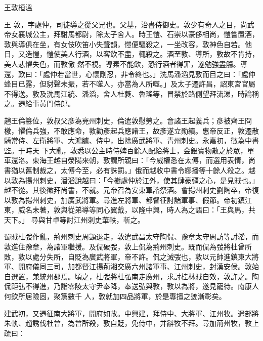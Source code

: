 
\begin{pinyinscope}

 王敦桓溫



 王
 敦，字處仲，司徒導之從父兄也。父基，治書侍御史。敦少有奇人之目，尚武帝女襄城公主，拜駙馬都尉，除太子舍人。時王愷、石崇以豪侈相尚，愷嘗置酒，敦與導俱在坐，有女伎吹笛小失聲韻，愷便驅殺之，一坐改容，敦神色自若。他日，又造愷，愷使美人行酒，以客飲不盡，輒殺之。酒至敦、導所，敦故不肯持，美人悲懼失色，而敦傲
 然不視。導素不能飲，恐行酒者得罪，遂勉強盡觴。導還，歎曰：「處仲若當世，心懷剛忍，非令終也。」洗馬潘滔見敦而目之曰：「處仲蜂目已露，但豺聲未振，若不噬人，亦當為人所噬。」及太子遷許昌，詔東宮官屬不得送。敦及洗馬江統、潘滔，舍人杜蕤、魯瑤等，冒禁於路側望拜流涕，時論稱之。遷給事黃門侍郎。



 趙王倫篡位，敦叔父彥為兗州刺史，倫遣敦慰勞之。會諸王起義兵；彥被齊王冏檄，懼倫兵強，不敢應命，敦勸彥起兵應諸王，故彥遂立勛績。惠帝反正，敦遷散騎常侍、左衛將軍、大鴻臚、侍中，出除廣武將軍、青州刺史。永嘉初，徵為中書監。于時天
 下大亂，敦悉以公主時侍婢百餘人配給將士，金銀寶物散之於眾，單車還洛。東海王越自滎陽來朝，敦謂所親曰：「今威權悉在太傅，而選用表情，尚書猶以舊制裁之，太傅今至，必有誅罰。」俄而越收中書令繆播等十餘人殺之。越以敦為揚州刺史，潘滔說越曰：「今樹處仲於江外，使其肆豪彊之心，是見賊也。」越不從。其後徵拜尚書，不就。元帝召為安東軍諮祭酒。會揚州刺史劉陶卒，帝復以敦為揚州刺史，加廣武將軍。尋進左將軍、都督征討諸軍事、假節。帝初鎮江東，威名未著，敦與從弟導等同心翼戴，以隆中興，時人為之語曰：「王與馬，共天下。」
 尋與甘卓等討江州刺史華軼，斬之。



 蜀賊杜弢作亂，荊州刺史周顗退走，敦遣武昌太守陶侃、豫章太守周訪等討韜，而敦進住豫章，為諸軍繼援。及侃破弢，敦上侃為荊州刺史。既而侃為弢將杜曾所敗，敦以處分失所，自貶為廣武將軍，帝不許。侃之滅弢也，敦以元帥進鎮東大將軍、開府儀同三司，加都督江揚荊湘交廣六州諸軍事、江州刺史，封漢安侯。敦始自選置，兼統州郡焉。頃之，杜弢將杜弘南走廣州，求討桂林賊自效，敦許之。陶侃距弘不得進，乃詣零陵太守尹奉降，奉送弘與敦，敦以為將，遂見寵待。南康人何欽所居險固，聚黨數千
 人，敦就加四品將軍，於是專擅之迹漸彰矣。



 建武初，又遷征南大將軍，開府如故。中興建，拜侍中、大將軍、江州牧。遣部將朱軌、趙誘伐杜曾，為曾所殺，敦自貶，免侍中，并辭牧不拜。尋加荊州牧，敦上疏曰：




\end{pinyinscope}
